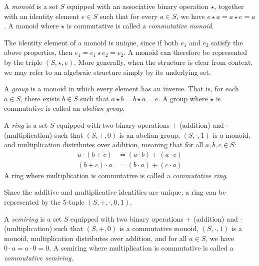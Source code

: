\documentclass[oneside, 11pt]{amsbook}
\theoremstyle{plain}
\theoremstyle{definition}
\theoremstyle{remark}
\begin{document}
\begin{defn}[Monoid]
    A \emph{monoid} is a set $S$ equipped with an associative binary operation $\star$, together with an identity element $e \in S$ such that for every $a \in S$, we have $e \star a = a \star e = a$. A monoid where $\star$ is commutative is called a \emph{commutative monoid}.
\end{defn}

The identity element of a monoid is unique, since if both $e_1$ and $e_2$ satisfy the above properties, then $e_1 = e_1 \star e_2 = e_2$. A monoid can therefore be represented by the triple $(S, \star, e)$. More generally, when the structure is clear from context, we may refer to an algebraic structure simply by its underlying set.

\begin{defn}[Group]
    A \emph{group} is a monoid in which every element has an inverse. That is, for each $a \in S$, there exists $b \in S$ such that $a \star b = b \star a = e$. A group where $\star$ is commutative is called an \emph{abelian group}.
\end{defn}

\begin{defn}[Ring]
    A \emph{ring} is a set $S$ equipped with two binary operations $+$ (addition) and $\cdot$ (multiplication) such that $(S, +, 0)$ is an abelian group, $(S, \cdot, 1)$ is a monoid, and multiplication distributes over addition, meaning that for all $a, b, c \in S$:
    \[
        \begin{aligned}
            a \cdot (b + c) & = (a \cdot b) + (a \cdot c) \\
            (b + c) \cdot a & = (b \cdot a) + (c \cdot a)
        \end{aligned}
    \]
    A ring where multiplication is commutative is called a \emph{commutative ring}.
\end{defn}

Since the additive and multiplicative identities are unique, a ring can be represented by the 5-tuple $(S, +, \cdot, 0, 1)$.

\begin{defn}[Semiring]
    A \emph{semiring} is a set $S$ equipped with two binary operations $+$ (addition) and $\cdot$ (multiplication) such that $(S, +, 0)$ is a commutative monoid, $(S, \cdot, 1)$ is a monoid, multiplication distributes over addition, and for all $a \in S$, we have $0 \cdot a = a \cdot 0 = 0$. A semiring where multiplication is commutative is called a \emph{commutative semiring}.
\end{defn}
\end{document}
